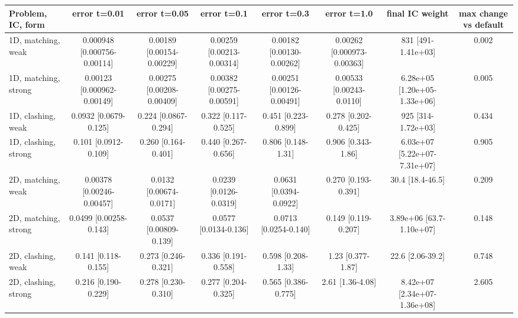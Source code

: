 \begin{tabular}{lccccccc}
\toprule
Problem, IC, form & error t=0.01 & error t=0.05 & error t=0.1 & error t=0.3 & error t=1.0 & final IC weight & max change vs default \\
\midrule
1D, matching, weak & 0.000948 {\scriptsize[0.000756-0.00114]} & 0.00189 {\scriptsize[0.00154-0.00229]} & 0.00259 {\scriptsize[0.00213-0.00314]} & 0.00182 {\scriptsize[0.00130-0.00262]} & 0.00262 {\scriptsize[0.000973-0.00363]} & 831 {\scriptsize[491-1.41e+03]} & 0.002 \\
1D, matching, strong & 0.00123 {\scriptsize[0.000962-0.00149]} & 0.00275 {\scriptsize[0.00208-0.00409]} & 0.00382 {\scriptsize[0.00275-0.00591]} & 0.00251 {\scriptsize[0.00126-0.00491]} & 0.00533 {\scriptsize[0.00243-0.0110]} & 6.28e+05 {\scriptsize[1.20e+05-1.33e+06]} & 0.005 \\
1D, clashing, weak & 0.0932 {\scriptsize[0.0679-0.125]} & 0.224 {\scriptsize[0.0867-0.294]} & 0.322 {\scriptsize[0.117-0.525]} & 0.451 {\scriptsize[0.223-0.899]} & 0.278 {\scriptsize[0.202-0.425]} & 925 {\scriptsize[314-1.72e+03]} & 0.434 \\
1D, clashing, strong & 0.101 {\scriptsize[0.0912-0.109]} & 0.260 {\scriptsize[0.164-0.401]} & 0.440 {\scriptsize[0.267-0.656]} & 0.806 {\scriptsize[0.148-1.31]} & 0.906 {\scriptsize[0.343-1.86]} & 6.03e+07 {\scriptsize[5.22e+07-7.31e+07]} & 0.905 \\
2D, matching, weak & 0.00378 {\scriptsize[0.00246-0.00457]} & 0.0132 {\scriptsize[0.00674-0.0171]} & 0.0239 {\scriptsize[0.0126-0.0319]} & 0.0631 {\scriptsize[0.0394-0.0922]} & 0.270 {\scriptsize[0.193-0.391]} & 30.4 {\scriptsize[18.4-46.5]} & 0.209 \\
2D, matching, strong & 0.0499 {\scriptsize[0.00258-0.143]} & 0.0537 {\scriptsize[0.00809-0.139]} & 0.0577 {\scriptsize[0.0134-0.136]} & 0.0713 {\scriptsize[0.0254-0.140]} & 0.149 {\scriptsize[0.119-0.207]} & 3.89e+06 {\scriptsize[63.7-1.10e+07]} & 0.148 \\
2D, clashing, weak & 0.141 {\scriptsize[0.118-0.155]} & 0.273 {\scriptsize[0.246-0.321]} & 0.336 {\scriptsize[0.191-0.558]} & 0.598 {\scriptsize[0.208-1.33]} & 1.23 {\scriptsize[0.377-1.87]} & 22.6 {\scriptsize[2.06-39.2]} & 0.748 \\
2D, clashing, strong & 0.216 {\scriptsize[0.190-0.229]} & 0.278 {\scriptsize[0.230-0.310]} & 0.277 {\scriptsize[0.204-0.325]} & 0.565 {\scriptsize[0.386-0.775]} & 2.61 {\scriptsize[1.36-4.08]} & 8.42e+07 {\scriptsize[2.34e+07-1.36e+08]} & 2.605 \\
\bottomrule
\end{tabular}

